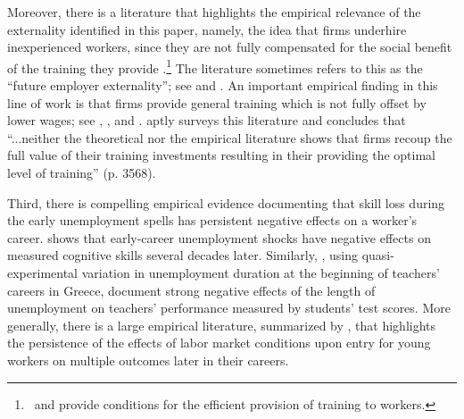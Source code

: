 \documentclass[12pt]{article} %
\theoremstyle{definition}
\begin{document}
Moreover, there is a literature that highlights the empirical relevance of the externality identified in this paper, namely, the idea that firms underhire inexperienced workers, since they are not fully compensated for the social benefit of the training they provide \citep{becker2009human, acemoglu1997training, acemoglu1999beyond}.\footnote{\,\cite{moen2004does} and \cite{lentz2024training} provide conditions for the efficient provision of training to workers.}
The literature sometimes refers to this as the ``future employer externality''; see \cite{acemoglu1997training} and \cite{lentz2024training}.
An important empirical finding in this line of work is that firms provide general training which is not fully offset by lower wages; see \cite{acemoglu1998firms}, \cite{loewenstein1998dividing}, and \cite{autor2001temporary}.
\cite{pallais2014inefficient} aptly surveys this literature and concludes that ``...neither the theoretical nor the empirical literature shows that firms recoup the full value of their training investments resulting in their providing the optimal level of training'' (p. 3568).



Third, there is compelling empirical evidence documenting that skill loss during the early unemployment spells has persistent negative effects on a worker's career.
\cite{arellano2022effect} shows that early-career unemployment shocks have negative effects on measured cognitive skills several decades later. 
Similarly, \cite{dinerstein2022human}, using quasi-experimental variation in unemployment duration at the beginning of teachers' careers in Greece, document strong negative effects of the length of unemployment on teachers' performance measured by students' test scores.
More generally, there is a large empirical literature, summarized by \cite{wachter2020persistent}, that highlights the persistence of the effects of labor market conditions upon entry for young workers on multiple outcomes later in their careers.
\end{document}
